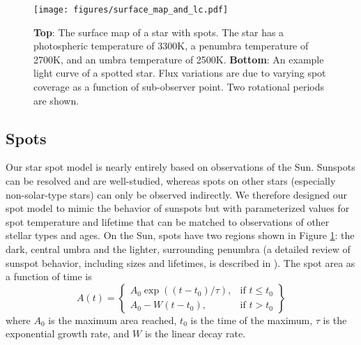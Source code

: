 \documentclass[linenumbers,5p,twocolumn,authoryear]{elsarticle}
\begin{document}
\begin{figure}
    \centering
        \texttt{[image: figures/surface\_map\_and\_lc.pdf]}
    \caption{{\bf Top}: The surface map of a star with spots. The star has a photospheric temperature of 3300K, a penumbra temperature of 2700K, and an umbra temperature of 2500K.
    {\bf Bottom}: An example light curve of a spotted star. Flux variations are due to varying spot coverage as a function of sub-observer point. Two rotational periods are shown.
    }
    \label{fig:surface_map}
\end{figure}

\subsection{Spots \label{subsec:spots}}
Our star spot model is nearly entirely based on observations of the Sun. Sunspots can be resolved and are well-studied, whereas spots on other stars (especially non-solar-type stars) can only be observed indirectly. We therefore designed our spot model to mimic the behavior of sunspots but with parameterized values for spot temperature and lifetime that can be matched to observations of other stellar types and ages. On the Sun, spots have two regions shown in Figure \ref{fig:surface_map}: the dark, central umbra and the lighter, surrounding penumbra (a detailed review of sunspot behavior, including sizes and lifetimes, is described in \citet{solanki2003}). The spot area as a function of time is
\begin{equation}
    A(t) = \left\{
    \begin{array}{lr}
        A_0 \exp{((t-t_0)/\tau)}, & \text{if } t \leq t_0 \\
        A_0 - W(t-t_0), & \text{if } t > t_0
    \end{array}
    \right\}
\end{equation}
where $A_0$ is the maximum area reached, $t_0$ is the time of the maximum, $\tau$ is the exponential growth rate, and $W$ is the linear decay rate.
\end{document}
